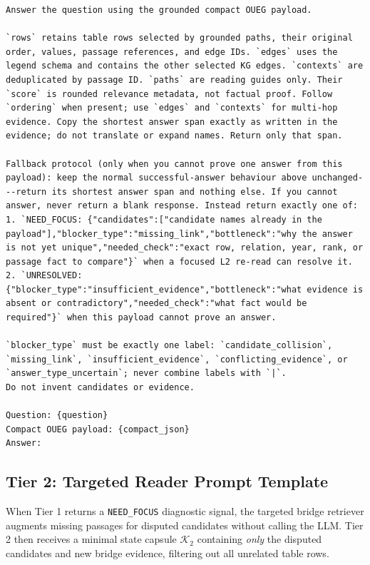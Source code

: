 \documentclass[runningheads]{llncs}
\begin{document}
\begin{lstlisting}[caption={Tier 1 Prompt Template (Primary Reader with Diagnostic Protocol)}]
Answer the question using the grounded compact OUEG payload.

`rows` retains table rows selected by grounded paths, their original order, values, passage references, and edge IDs. `edges` uses the legend schema and contains the other selected KG edges. `contexts` are deduplicated by passage ID. `paths` are reading guides only. Their `score` is rounded relevance metadata, not factual proof. Follow `ordering` when present; use `edges` and `contexts` for multi-hop evidence. Copy the shortest answer span exactly as written in the evidence; do not translate or expand names. Return only that span.

Fallback protocol (only when you cannot prove one answer from this payload): keep the normal successful-answer behaviour above unchanged---return its shortest answer span and nothing else. If you cannot answer, never return a blank response. Instead return exactly one of:
1. `NEED_FOCUS: {"candidates":["candidate names already in the payload"],"blocker_type":"missing_link","bottleneck":"why the answer is not yet unique","needed_check":"exact row, relation, year, rank, or passage fact to compare"}` when a focused L2 re-read can resolve it.
2. `UNRESOLVED: {"blocker_type":"insufficient_evidence","bottleneck":"what evidence is absent or contradictory","needed_check":"what fact would be required"}` when this payload cannot prove an answer.

`blocker_type` must be exactly one label: `candidate_collision`, `missing_link`, `insufficient_evidence`, `conflicting_evidence`, or `answer_type_uncertain`; never combine labels with `|`.
Do not invent candidates or evidence.

Question: {question}
Compact OUEG payload: {compact_json}
Answer:
\end{lstlisting}

\subsection{Tier 2: Targeted Reader Prompt Template}
When Tier 1 returns a \texttt{NEED\_FOCUS} diagnostic signal, the targeted bridge retriever augments missing passages for disputed candidates without calling the LLM. Tier 2 then receives a minimal state capsule $\mathcal{K}_2$ containing \emph{only} the disputed candidates and new bridge evidence, filtering out all unrelated table rows.
\end{document}
